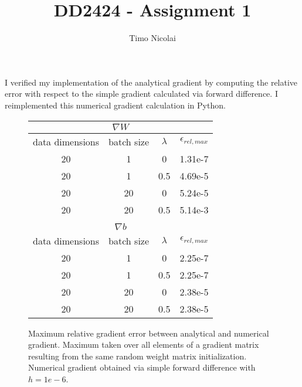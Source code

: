 \documentclass{article}
\begin{document}
\title{DD2424 - Assignment 1}
\author{Timo Nicolai}

\maketitle

\noindent
I verified my implementation of the analytical gradient by computing the relative
error with respect to the simple gradient calculated via forward difference.
I reimplemented this numerical gradient calculation in Python.

\begin{figure}[H]
  \centering
    \tiny
    \begin{tabular}{|c|c|c|c|}
    \multicolumn{4}{c}{$\nabla W$}                                  \\
    \hline
    data dimensions & batch size & $\lambda$ & $\epsilon_{rel,max}$ \\
    \hline
    20              & 1          & 0         & 1.31e-7              \\
    \hline
    20              & 1          & 0.5       & 4.69e-5              \\
    \hline
    20              & 20         & 0         & 5.24e-5              \\
    \hline
    20              & 20         & 0.5       & 5.14e-3              \\
    \hline

    \multicolumn{4}{c}{}                                            \\

    \multicolumn{4}{c}{$\nabla b$}                                  \\
    \hline
    data dimensions & batch size & $\lambda$ & $\epsilon_{rel,max}$ \\
    \hline
    20              & 1          & 0         & 2.25e-7              \\
    \hline
    20              & 1          & 0.5       & 2.25e-7              \\
    \hline
    20              & 20         & 0         & 2.38e-5              \\
    \hline
    20              & 20         & 0.5       & 2.38e-5              \\
    \hline
    \end{tabular}
  \caption{Maximum relative gradient error between analytical and numerical
           gradient. Maximum taken over all elements of a gradient matrix
           resulting from the same random weight matrix initialization. Numerical
           gradient obtained via simple forward difference with $h = 1e-6$.}
  \label{fig:gradient}
\end{figure}
\end{document}
